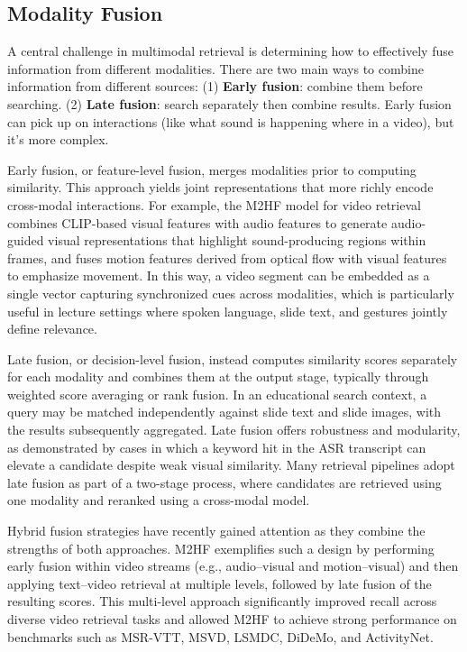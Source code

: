 \subsection{Modality Fusion}
  
A central challenge in multimodal retrieval is determining how to effectively fuse information from different modalities. There are two main ways to combine information from different sources: (1) \textbf{Early fusion}: combine them before searching. (2) \textbf{Late fusion}: search separately then combine results. Early fusion can pick up on interactions (like what sound is happening where in a video), but it's more complex.

Early fusion, or feature-level fusion, merges modalities prior to computing similarity. This approach yields joint representations that more richly encode cross-modal interactions. For example, the M2HF model for video retrieval combines CLIP-based visual features with audio features to generate audio-guided visual representations that highlight sound-producing regions within frames, and fuses motion features derived from optical flow with visual features to emphasize movement. In this way, a video segment can be embedded as a single vector capturing synchronized cues across modalities, which is particularly useful in lecture settings where spoken language, slide text, and gestures jointly define relevance.

Late fusion, or decision-level fusion, instead computes similarity scores separately for each modality and combines them at the output stage, typically through weighted score averaging or rank fusion. In an educational search context, a query may be matched independently against slide text and slide images, with the results subsequently aggregated. Late fusion offers robustness and modularity, as demonstrated by cases in which a keyword hit in the ASR transcript can elevate a candidate despite weak visual similarity. Many retrieval pipelines adopt late fusion as part of a two-stage process, where candidates are retrieved using one modality and reranked using a cross-modal model.

Hybrid fusion strategies have recently gained attention as they combine the strengths of both approaches. M2HF exemplifies such a design by performing early fusion within video streams (e.g., audio–visual and motion–visual) and then applying text–video retrieval at multiple levels, followed by late fusion of the resulting scores. This multi-level approach significantly improved recall across diverse video retrieval tasks and allowed M2HF to achieve strong performance on benchmarks such as MSR-VTT, MSVD, LSMDC, DiDeMo, and ActivityNet.

